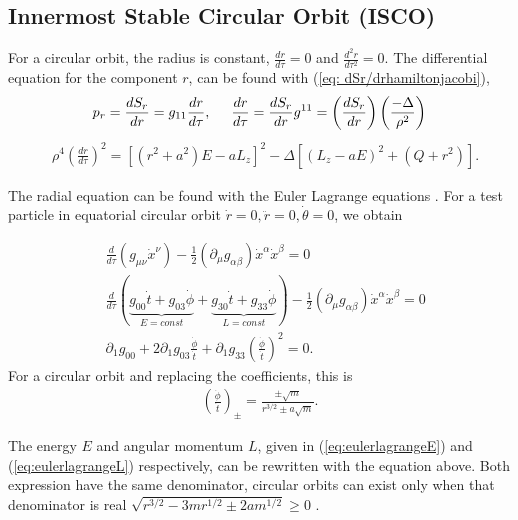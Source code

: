 \subsection*{Innermost Stable Circular Orbit (ISCO)}
For a circular orbit, the radius is constant, $\frac{dr}{d\tau} = 0$ and $\frac{d^2r}{d\tau^2} = 0$. The differential equation for the component $r$, can be found with (\ref{eq: dSr/drhamiltonjacobi})\cite{Raine},
\begin{align*}
 p _r = \frac{dS_r}{dr} = g_{11}\frac{dr}{d\tau}, \hspace{0.5cm} \frac{dr}{d\tau} = \frac{dS_r}{dr}g^{11} = \left(\frac{dS_r}{dr}\right)\left(\frac{-\Delta}{\rho^2}\right)
\end{align*}
\begin{align}
	\label{eq: dr/dtau}
	&\rho^4 \left(\frac{dr}{d\tau}\right)^2  =  \left[(r^2+a^2)E - aL_z\right]^2 - \Delta\left[(L_z -aE)^2 + (Q+r^2)\right].
\end{align}

The radial equation can be found with the Euler Lagrange equations \cite{Bambi}. For a test particle in equatorial circular orbit $\dot{r} = 0, \ddot{r} = 0, \dot{\theta} = 0 $, we obtain

\begin{align*}
	&\frac{d}{d\tau}(g_{\mu\nu}\dot{x}^\nu) - \frac{1}{2}(\partial_\mu g_{\alpha\beta})\dot{x}^\alpha \dot{x}^\beta =0 \\
	&\frac{d}{d\tau}(\underbrace{g_{00}\dot{t} + g_{03}\dot{\phi}}_{E = const} + \underbrace{g_{30}\dot{t}+g_{33}\dot{\phi}}_{L = const}) -\frac{1}{2}(\partial_\mu g_{\alpha\beta})\dot{x}^\alpha \dot{x}^\beta =0 \\
	&\partial_1g_{00}+ 2 \partial_1 g_{03} \frac{\dot{\phi}}{\dot{t}} + \partial_1 g_{33} \left(\frac{\dot{\phi}}{\dot{t}} \right)^2  = 0.
\end{align*}
For a circular orbit and replacing the coefficients, this is
\begin{align}
\label{eq: angularvelocity}
	\left(\frac{\dot{\phi}}{\dot{t}} \right)_{\pm} = \frac{\pm \sqrt{m}}{r^{3/2}\pm a\sqrt{m}}.
\end{align}

The energy $E$ and angular momentum $L$, given in (\ref{eq:eulerlagrangeE}) and (\ref{eq:eulerlagrangeL}) respectively, can be rewritten with the equation above. Both expression have the same denominator, circular orbits can exist only when that denominator is real $\sqrt{r^{3/2} - 3mr^{1/2} \pm 2am^{1/2}} \geq 0$ \cite{Raine}.\\

